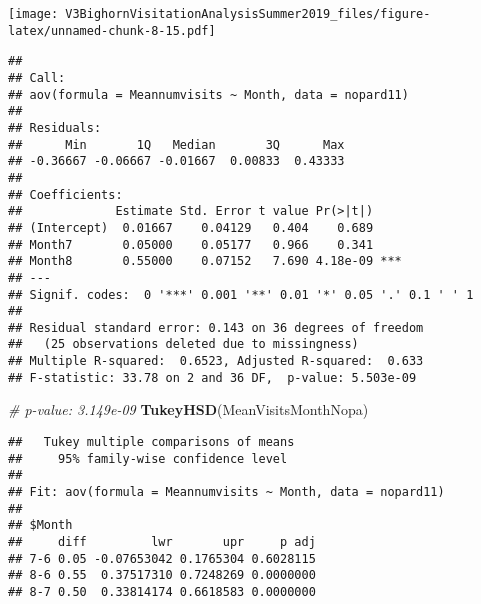 \documentclass[]{article}
\newenvironment{Shaded}{\begin{snugshade}}{\end{snugshade}}
\newcommand{\CommentTok}[1]{\textcolor[rgb]{0.56,0.35,0.01}{\textit{#1}}}
\newcommand{\DataTypeTok}[1]{\textcolor[rgb]{0.13,0.29,0.53}{#1}}
\newcommand{\KeywordTok}[1]{\textcolor[rgb]{0.13,0.29,0.53}{\textbf{#1}}}
\newcommand{\NormalTok}[1]{#1}
\newcommand{\OperatorTok}[1]{\textcolor[rgb]{0.81,0.36,0.00}{\textbf{#1}}}
\newcommand{\StringTok}[1]{\textcolor[rgb]{0.31,0.60,0.02}{#1}}
\begin{document}
\texttt{[image: V3BighornVisitationAnalysisSummer2019\_files/figure-latex/unnamed-chunk-8-15.pdf]}

\begin{Shaded}
\end{Shaded}

\begin{verbatim}
## 
## Call:
## aov(formula = Meannumvisits ~ Month, data = nopard11)
## 
## Residuals:
##      Min       1Q   Median       3Q      Max 
## -0.36667 -0.06667 -0.01667  0.00833  0.43333 
## 
## Coefficients:
##             Estimate Std. Error t value Pr(>|t|)    
## (Intercept)  0.01667    0.04129   0.404    0.689    
## Month7       0.05000    0.05177   0.966    0.341    
## Month8       0.55000    0.07152   7.690 4.18e-09 ***
## ---
## Signif. codes:  0 '***' 0.001 '**' 0.01 '*' 0.05 '.' 0.1 ' ' 1
## 
## Residual standard error: 0.143 on 36 degrees of freedom
##   (25 observations deleted due to missingness)
## Multiple R-squared:  0.6523, Adjusted R-squared:  0.633 
## F-statistic: 33.78 on 2 and 36 DF,  p-value: 5.503e-09
\end{verbatim}

\begin{Shaded}
\begin{Highlighting}[]
\CommentTok{#  p-value: 3.149e-09}
\KeywordTok{TukeyHSD}\NormalTok{(MeanVisitsMonthNopa)}
\end{Highlighting}
\end{Shaded}

\begin{verbatim}
##   Tukey multiple comparisons of means
##     95% family-wise confidence level
## 
## Fit: aov(formula = Meannumvisits ~ Month, data = nopard11)
## 
## $Month
##     diff         lwr       upr     p adj
## 7-6 0.05 -0.07653042 0.1765304 0.6028115
## 8-6 0.55  0.37517310 0.7248269 0.0000000
## 8-7 0.50  0.33814174 0.6618583 0.0000000
\end{verbatim}
\end{document}
